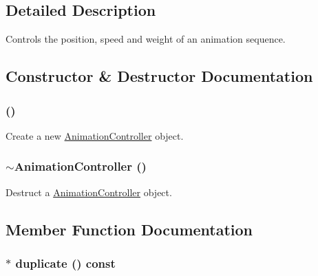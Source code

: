 \subsection{Detailed Description}
Controls the position, speed and weight of an animation sequence. 

\subsection{Constructor \& Destructor Documentation}
\hypertarget{classm3g_1_1AnimationController_f2e8cb2c6c916983d0f87140c7b0c98e}{
\subsubsection[{AnimationController}]{ ()}}
\label{classm3g_1_1AnimationController_f2e8cb2c6c916983d0f87140c7b0c98e}


Create a new \hyperlink{classm3g_1_1AnimationController}{AnimationController} object. \hypertarget{classm3g_1_1AnimationController_346849d0f82278f30dda9f35f80e9dbe}{
\subsubsection[{$\sim$AnimationController}]{\setlength{\rightskip}{0pt plus 5cm}$\sim${\bf AnimationController} ()}}
\label{classm3g_1_1AnimationController_346849d0f82278f30dda9f35f80e9dbe}


Destruct a \hyperlink{classm3g_1_1AnimationController}{AnimationController} object. 

\subsection{Member Function Documentation}
\hypertarget{classm3g_1_1AnimationController_aab6521891038ced0961ecb78611646e}{
\subsubsection[{duplicate}]{ $\ast$ duplicate () const}}
\label{classm3g_1_1AnimationController_aab6521891038ced0961ecb78611646e}


